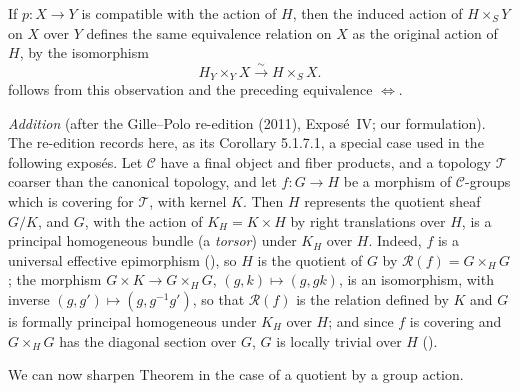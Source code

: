 If \(p:X\to Y\) is compatible with the action of \(H\), then the induced
action of \(H\times_SY\) on \(X\) over \(Y\) defines the same equivalence
relation on \(X\) as the original action of \(H\), by the isomorphism
\[
  H_Y\times_YX\xrightarrow{\sim}H\times_SX.
\]
 follows from this observation and the preceding equivalence
\(\Leftrightarrow\).

\par\medskip\noindent
{}\emph{Addition} (after the Gille--Polo re-edition (2011), Expos\'e~IV;
our formulation).  The re-edition records here, as its Corollary 5.1.7.1, a
special case used in the following expos\'es. Let \(\mathscr C\) have a final
object and fiber products, and a topology \(\mathcal T\) coarser than the
canonical topology, and let \(f\colon G\to H\) be a morphism of
\(\mathscr C\)-groups which is covering for \(\mathcal T\), with kernel \(K\).
Then \(H\) represents the quotient sheaf \(G/K\), and \(G\), with the action
of \(K_H=K\times H\) by right translations over \(H\), is a principal
homogeneous bundle (a \emph{torsor}) under \(K_H\) over \(H\). Indeed, \(f\)
is a universal effective epimorphism (), so \(H\) is the quotient of
\(G\) by \(\mathscr R(f)=G\times_HG\); the morphism \(G\times K\to G\times_HG\),
\((g,k)\mapsto(g,gk)\), is an isomorphism, with inverse
\((g,g')\mapsto(g,g^{-1}g')\), so that \(\mathscr R(f)\) is the relation
defined by \(K\) and \(G\) is formally principal homogeneous under \(K_H\)
over \(H\); and since \(f\) is covering and \(G\times_HG\) has the diagonal
section over \(G\), \(G\) is locally trivial over \(H\) ().
\par\medskip

We can now sharpen Theorem  in the case of a quotient by a group action.

